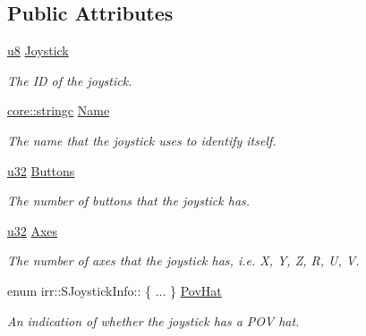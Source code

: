 \subsection*{Public Attributes}
\begin{DoxyCompactItemize}
\item 
\hyperlink{namespaceirr_a646874f69af8ff87fc10201b0254a761}{u8} \hyperlink{structirr_1_1SJoystickInfo_a691ed1bcdbf4ab3b30a4e9ed648c6d9d}{Joystick}
\begin{DoxyCompactList}\small\item\em The ID of the joystick. \end{DoxyCompactList}\item 
\mbox{\label{structirr_1_1SJoystickInfo_a56d229ae1e1d9f18b252c2f6bf886815}} 
\hyperlink{namespaceirr_1_1core_ade1071a878633f2f6d8a75c5d11fec19}{core\+::stringc} \hyperlink{structirr_1_1SJoystickInfo_a56d229ae1e1d9f18b252c2f6bf886815}{Name}
\begin{DoxyCompactList}\small\item\em The name that the joystick uses to identify itself. \end{DoxyCompactList}\item 
\mbox{\label{structirr_1_1SJoystickInfo_a31422460c315e69bc057367cb66e4d23}} 
\hyperlink{namespaceirr_a0416a53257075833e7002efd0a18e804}{u32} \hyperlink{structirr_1_1SJoystickInfo_a31422460c315e69bc057367cb66e4d23}{Buttons}
\begin{DoxyCompactList}\small\item\em The number of buttons that the joystick has. \end{DoxyCompactList}\item 
\hyperlink{namespaceirr_a0416a53257075833e7002efd0a18e804}{u32} \hyperlink{structirr_1_1SJoystickInfo_a0a09d1c3fc664207abaa610e5896b0c5}{Axes}
\begin{DoxyCompactList}\small\item\em The number of axes that the joystick has, i.\+e. X, Y, Z, R, U, V. \end{DoxyCompactList}\item 
enum irr\+::\+S\+Joystick\+Info\+:: \{ ... \}  \hyperlink{structirr_1_1SJoystickInfo_a2abf9d4741731c29fe4d9d64f7909d1e}{Pov\+Hat}
\begin{DoxyCompactList}\small\item\em An indication of whether the joystick has a P\+OV hat. \end{DoxyCompactList}\end{DoxyCompactItemize}


